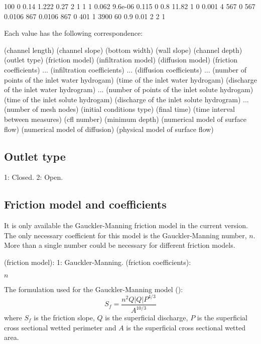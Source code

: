 \documentclass[a4paper,12pt]{report}
\begin{document}
{\footnotesize
\begin{boxedverbatim}
100 0 0.14 1.222 0.27
2
1 1 1
0.062
9.6e-06 0.115 0 0.8
11.82
1
0 0.001
4
567 0
567 0.0106
867 0.0106
867 0
401 1
3900 60 0.9 0.01
2 2
1
\end{boxedverbatim}
}

Each value has the following correspondence:

{\footnotesize
\begin{boxedverbatim}
(channel length) (channel slope) (bottom width) (wall slope) (channel depth)
(outlet type)
(friction model) (infiltration model) (diffusion model)
(friction coefficients) ...
(infiltration coefficients) ...
(diffusion coefficients) ...
(number of points of the inlet water hydrogam)
(time of the inlet water hydrogam) (discharge of the inlet water hydrogram)
...
(number of points of the inlet solute hydrogam)
(time of the inlet solute hydrogam) (discharge of the inlet solute hydrogram)
...
(number of mesh nodes) (initial conditions type)
(final time) (time interval between measures) (cfl number) (minimum depth)
(numerical model of surface flow) (numerical model of diffusion)
(physical model of surface flow)
\end{boxedverbatim}
}

\subsection{Outlet type}
\begin{verbatimtab}
	1: Closed.
	2: Open.
\end{verbatimtab}

\subsection{Friction model and coefficients}
It is only available the Gauckler-Manning friction model in the current version. The only necessary coefficient for this model is the Gauckler-Manning number, $n$.
More than a single number could be necessary for different friction models. 
\begin{verbatimtab}[4]
(friction model): 
		1: Gauckler-Manning.
(friction coefficients):
\end{verbatimtab}
\vspace{-0.60cm}
\hspace{1.8cm}$n$

The formulation used for the Gauckler-Manning model (\cite{JaviSurcos1}):
\begin{equation}
S_f=\frac{n^2 Q|Q|P^{4/3}}{A^{10/3}}
\end{equation}
\noindent where $S_f$ is the friction slope, $Q$ is the superficial discharge, $P$ is the superficial cross sectional wetted perimeter
and $A$ is the superficial cross sectional wetted area.
\end{document}
